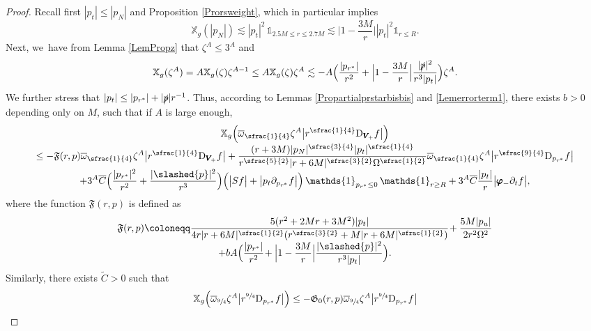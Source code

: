 \documentclass[JEP,XML,SOM,Unicode,published]{cedram}
\theoremstyle{plain}
\theoremstyle{definition}
\newcommand\z{{\zeta}}
\newcommand\T{{\mathbb{X}}}
\begin{document}
\begin{proof}
Recall first $|p_t| \leq |p_N|$ and Proposition \ref{Prorsweight}, which in particular implies\vspace*{-3pt}\enlargethispage{.5\baselineskip}
\[
\T_g(|p_N|) \lesssim |p_t|^2 \, \mathds{1}_{2.5M \leq r \leq 2.7M} \lesssim \Big| 1-\frac{3M}{r} \Big| |p_t|^2 \mathds{1}_{r \leq R}.
\]
Next, we~have from Lemma \ref{LemPropz} that $\z^A \leq 3^A$ and\vspace*{-3pt}
\[
\T_g (\z^A) = A \T_g(\z) \z^{A-1} \leq A \T_g(\z) \z^{A} \lesssim -A\Bigl(\frac{|p_{r^*}|}{r^2}+ \Bigl |1-\frac{3M}{r} \Bigr | \frac{|\slashed{p}|^2}{r^3|p_t|} \Bigr) \z^A.
\]
We further stress that $|p_t| \leq |p_{r^*}|+|\slashed{p}|r^{-1}$. Thus, according to Lemmas \ref{Propartialprstarbisbis} and \ref{Lemerrorterm1}, there exists $b>0$ depending only on $M$, such that if $A$ is large enough,\vspace*{-5pt}
\begin{multline*}
 \T_g \Bigl(\overline{\omega}_{\sfrac{1}{4}} \z^A \big| r^{\sfrac{1}{4}}\mathrm{D}_{\pmb{V}_{\!+}} f \big| \Bigr) \\[-3pt]
\leq - \mathfrak{F}(r,p) \overline{\omega}_{\sfrac{1}{4}} \z^A \big| r^{\sfrac{1}{4}}\mathrm{D}_{\pmb{V}_{\!+}} f \big| + \frac{(r+3M)|p_N|^{\sfrac{3}{4}} |p_t|^{\sfrac{1}{4}} }{r^{\sfrac{5}{2}}|r+6M|^{\sfrac{3}{2}}\Omega^{\sfrac{1}{2}}} \overline{\omega}_{\sfrac{1}{4}} \z^A \big|r^{\sfrac{9}{4}} \mathrm{D}_{p_{r^*}}f \big| \\[-3pt]
+ 3^A\overline{C}\Bigl(\frac{|p_{r^*}|^2}{r^2 }+ \frac{|\slashed{p}|^2}{r^3 } \Bigr) \Bigl(\big|Sf \big|+ \big|p_t \partial_{p_{r^*}} f\big| \Bigr) \, \mathds{1}_{p_{r^*} \leq 0} \, \mathds{1}_{r \geq R}+3^A\overline{C}\frac{|p_t|}{r}\big| \pmb{\varphi}_- \partial_t f \big|,
\end{multline*}
where the function $\mathfrak{F}(r,p)$ is defined as\vspace*{-5pt}
\begin{multline*}
\mathfrak{F}(r,p) \coloneqq \frac{5(r^2+2Mr+3M^2)|p_t|}{4r|r+6M|^{\sfrac{1}{2}}(r^{\sfrac{3}{2}}+M|r+6M|^{\sfrac{1}{2}}) } \! +\frac{5M|p_u|}{2r^2\Omega^2} \\[-3pt]
+ bA \Bigl(\frac{|p_{r^*}|}{r^2} \! + \Bigl |1-\frac{3M}{r} \Bigr| \frac{|\slashed{p}|^2}{r^3|p_t|} \Bigr).
\end{multline*}
Similarly, there exists $\widetilde{C}>0$ such that\vspace*{-5pt}
\begin{multline*}
\T_g \Bigl(\overline{\omega}_{\sfrac{9}{4}} \z^A \big|r^{\sfrac{9}{4}} \mathrm{D }_{p_{r^*}} f \big| \Bigr) \leq - \mathfrak{G}_0(r,p) \overline{\omega}_{\sfrac{9}{4}} \z^A \big|r^{\sfrac{9}{4}} \mathrm{D }_{p_{r^*}} f \big|\\

\end{multline*}
\end{proof}
\end{document}
